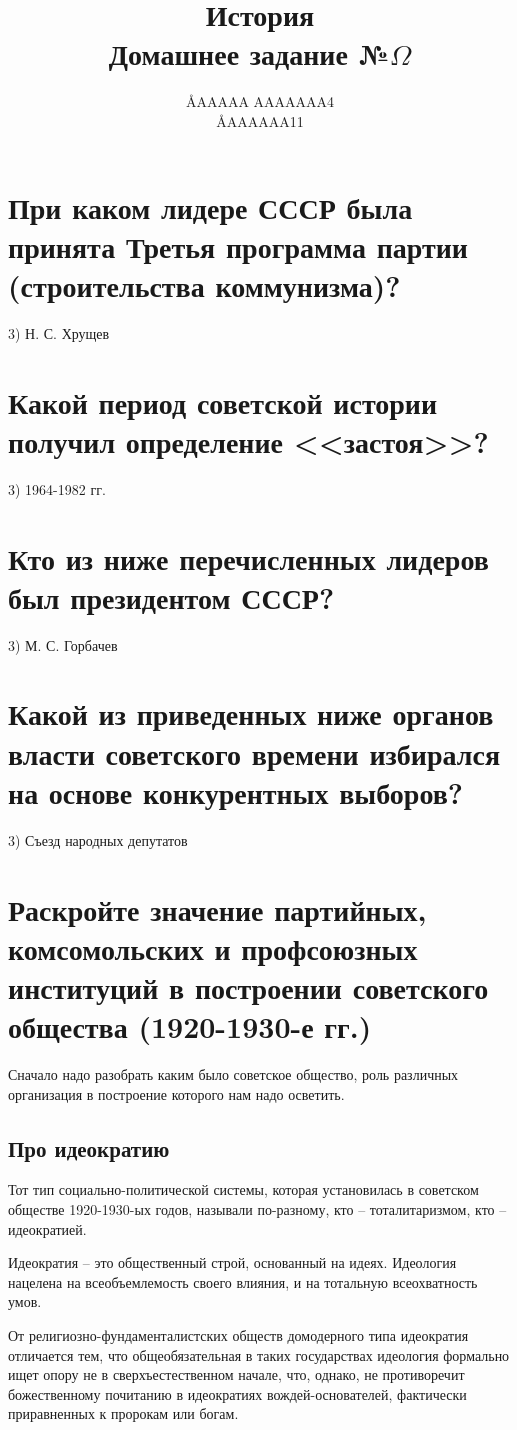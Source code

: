 \documentclass[12pt]{article}
\title{История \\ Домашнее задание №$\Omega$}
\author{\AA{AAAAA AAAAAAA}{4} \\ \AA{AAAAAA}{11}}
\begin{document}
  \maketitle

  \section{При каком лидере СССР была принята Третья программа партии (строительства коммунизма)?}
  3) Н. С. Хрущев

  \section{Какой период советской истории получил определение <<застоя>>?}
  3) 1964-1982 гг.

  \section{Кто из ниже перечисленных лидеров был президентом СССР?}
  3) М. С. Горбачев

  \section{Какой из приведенных ниже органов власти советского времени избирался на основе конкурентных выборов?}
  3) Съезд народных депутатов

  \newpage
  \section{Раскройте значение партийных, комсомольских и профсоюзных институций в построении советского общества (1920-1930-е гг.)}
  Сначало надо разобрать каким было советское общество, роль различных организация в построение которого нам надо осветить.

  \subsection{Про идеократию}
  Тот тип социально-политической системы, которая установилась в советском обществе 1920-1930-ых годов,
  называли по-разному, кто -- тоталитаризмом, кто -- идеократией.

  Идеократия -- это общественный строй, основанный на идеях.
  Идеология нацелена на всеобъемлемость своего влияния, и на тотальную всеохватность умов.

  От религиозно-фундаменталистских обществ домодерного типа идеократия отличается тем,
  что общеобязательная в таких государствах идеология формально ищет опору не в сверхъестественном начале,
  что, однако, не противоречит божественному почитанию в идеократиях вождей-основателей, фактически приравненных к пророкам или богам.
\end{document}
